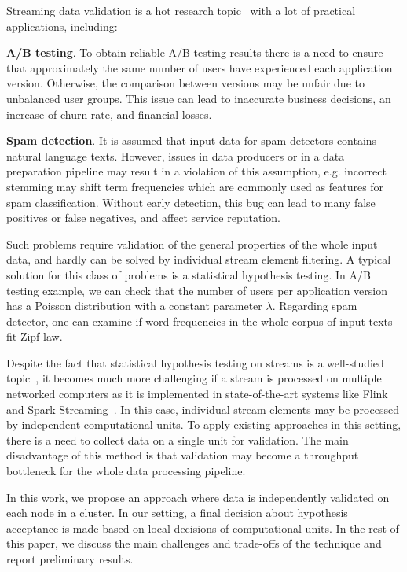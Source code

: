 \label {fs-short-intro}

Streaming data validation is a hot research topic~\cite{Xu:2013:MVS:2488222.2488275, frank2018semantic} with a lot of practical applications, including:

{\bf A/B testing}. To obtain reliable A/B testing results there is a need to ensure that approximately the same number of users have experienced each application version. Otherwise, the comparison between versions may be unfair due to unbalanced user groups. This issue can lead to inaccurate business decisions, an increase of churn rate, and financial losses.
    
{\bf Spam detection}. It is assumed that input data for spam detectors contains natural language texts. However, issues in data producers or in a data preparation pipeline may result in a violation of this assumption, e.g. incorrect stemming may shift term frequencies which are commonly used as features for spam classification. Without early detection, this bug can lead to many false positives or false negatives, and affect service reputation.

Such problems require validation of the general properties of the whole input data, and hardly can be solved by individual stream element filtering. A typical solution for this class of problems is a statistical hypothesis testing. In A/B testing example, we can check that the number of users per application version has a Poisson distribution with a constant parameter $\lambda$. Regarding spam detector, one can examine if word frequencies in the whole corpus of input texts fit Zipf law. 

Despite the fact that statistical hypothesis testing on streams is a well-studied topic~\cite{kifer2004detecting, lall2015data}, it becomes much more challenging if a stream is processed on multiple networked computers as it is implemented in state-of-the-art systems like Flink~\cite{Carbone:2017:SMA:3137765.3137777} and Spark Streaming~\cite{Zaharia:2012:DSE:2342763.2342773}. In this case, individual stream elements may be processed by independent computational units. To apply existing approaches in this setting, there is a need to collect data on a single unit for validation. The main disadvantage of this method is that validation may become a throughput bottleneck for the whole data processing pipeline. 

In this work, we propose an approach where data is independently validated on each node in a cluster. In our setting, a final decision about hypothesis acceptance is made based on local decisions of computational units. In the rest of this paper, we discuss the main challenges and trade-offs of the technique and report preliminary results.